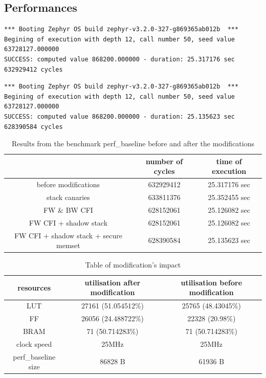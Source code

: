 \documentclass[9pt]{article}
\begin{document}
\begin{multicols}{2}
\subsection{Performances}

\begin{lstlisting}[style=consoleLarge, caption={Results of the benchmark on the non-modified hardware, OS and compiler}]
*** Booting Zephyr OS build zephyr-v3.2.0-327-g869365ab012b  ***
Begining of execution with depth 12, call number 50, seed value 63728127.000000
SUCCESS: computed value 868200.000000 - duration: 25.317176 sec 632929412 cycles
\end{lstlisting}

\begin{lstlisting}[style=consoleLarge, caption={Results of the benchmark on the FW CFI + shadow stack + secure memset HW, OS and compiler}]
*** Booting Zephyr OS build zephyr-v3.2.0-327-g869365ab012b  ***
Begining of execution with depth 12, call number 50, seed value 63728127.000000
SUCCESS: computed value 868200.000000 - duration: 25.135623 sec 628390584 cycles
\end{lstlisting}


\begin{table}[H]
    \centering
    \begin{tabular}{c|c|c}
         & number of cycles & time of execution \\ \hline \hline
         before modifications & 632929412 & 25.317176 sec \\\hline
         stack canaries & 633811376 & 25.352455 sec \\ \hline
         FW \& BW CFI & 628152061 &  25.126082 sec\\ \hline
         FW CFI + shadow stack  & 628152061 &  25.126082 sec \\ \hline
         FW CFI + shadow stack + secure memset & 628390584 &  25.135623  sec
    \end{tabular}
    \caption{Results from the benchmark perf\_baseline before and after the modifications}
\end{table}


\begin{table}[H]
    \centering
    \begin{tabular}{c||c|c}
    resources & utilisation after modification & utilisation before modification \\ \hline\hline
    LUT	& 27161 (51.054512\%) & 25765 (48.43045\%)\\
    FF & 26056 (24.488722\%) & 22328 (20.98\%)\\
    BRAM & 71 (50.714283\%) & 71 (50.714283\%) \\
    clock speed & 25MHz & 25MHz\\
    perf\_baseline size & 86828 B & 61936 B\\
    \end{tabular}
    \caption{Table of modification's impact}
\end{table}


\end{multicols}
\end{document}
